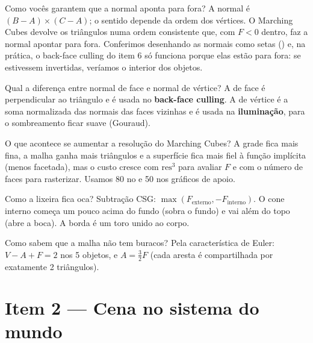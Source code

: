 \documentclass[11pt,a4paper]{article}
\newcommand{\novasecao}{\clearpage}
\newcommand{\code}[1]{\texttt{\detokenize{#1}}}
\begin{document}
\begin{pergunta}{Como vocês garantem que a normal aponta para fora?}
A normal é $(B-A)\times(C-A)$; o sentido depende da ordem dos vértices. O Marching Cubes devolve os
triângulos numa ordem consistente que, com $F<0$ dentro, faz a normal apontar para fora. Conferimos
desenhando as normais como setas (\code{visualizar_objetos.py}) e, na prática, o back-face culling do
item 6 só funciona porque elas estão para fora: se estivessem invertidas, veríamos o interior dos objetos.
\end{pergunta}

\begin{pergunta}{Qual a diferença entre normal de face e normal de vértice?}
A de face é perpendicular ao triângulo e é usada no \textbf{back-face culling}. A de vértice é a soma
normalizada das normais das faces vizinhas e é usada na \textbf{iluminação}, para o sombreamento ficar
suave (Gouraud).
\end{pergunta}

\begin{pergunta}{O que acontece se aumentar a resolução do Marching Cubes?}
A grade fica mais fina, a malha ganha mais triângulos e a superfície fica mais fiel à função implícita
(menos facetada), mas o custo cresce com $\text{res}^3$ para avaliar $F$ e com o número de faces para
rasterizar. Usamos 80 no \code{main.py} e 50 nos gráficos de apoio.
\end{pergunta}

\begin{pergunta}{Como a lixeira fica oca?}
Subtração CSG: $\max(F_{\text{externo}}, -F_{\text{interno}})$. O cone interno começa um pouco acima
do fundo (sobra o fundo) e vai além do topo (abre a boca). A borda é um toro unido ao corpo.
\end{pergunta}

\begin{pergunta}{Como sabem que a malha não tem buracos?}
Pela característica de Euler: $V - A + F = 2$ nos 5 objetos, e $A = \frac32 F$ (cada aresta é
compartilhada por exatamente 2 triângulos).
\end{pergunta}

\novasecao
\section{Item 2 — Cena no sistema do mundo}
\end{document}
